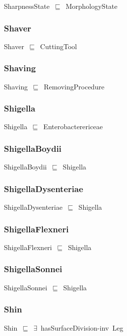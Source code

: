 \documentclass{article}
\begin{document}
SharpnessState~\ensuremath{\sqsubseteq}~MorphologyState~

\subsubsection*{Shaver}

Shaver~\ensuremath{\sqsubseteq}~CuttingTool~

\subsubsection*{Shaving}

Shaving~\ensuremath{\sqsubseteq}~RemovingProcedure~

\subsubsection*{Shigella}

Shigella~\ensuremath{\sqsubseteq}~Enterobacterericeae~

\subsubsection*{ShigellaBoydii}

ShigellaBoydii~\ensuremath{\sqsubseteq}~Shigella~

\subsubsection*{ShigellaDysenteriae}

ShigellaDysenteriae~\ensuremath{\sqsubseteq}~Shigella~

\subsubsection*{ShigellaFlexneri}

ShigellaFlexneri~\ensuremath{\sqsubseteq}~Shigella~

\subsubsection*{ShigellaSonnei}

ShigellaSonnei~\ensuremath{\sqsubseteq}~Shigella~

\subsubsection*{Shin}

Shin~\ensuremath{\sqsubseteq}~\ensuremath{\exists}~hasSurfaceDivision-inv~Leg~
\end{document}

